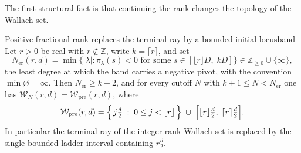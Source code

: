 \documentclass[11pt,letterpaper]{article}
\newcommand{\Zint}{\mathbb{Z}}
\begin{document}
The first structural fact is that continuing the rank changes the topology of the
Wallach set.

\begin{theorem}{Positive fractional rank replaces the terminal ray by a bounded initial locus}{band}
Let $r>0$ be real with $r\notin\Zint$, write $k=\lceil r\rceil$, and set
\begin{equation}
  N_{\mathrm{er}}(r,d)
  =\min\bigl\{|\lambda| : \pi_\lambda(s)<0 \text{ for some }
     s\in[\lfloor r\rfloor D,\;kD]\bigr\}\in\Zint_{\ge0}\cup\{\infty\},
  \label{eq:nero}
\end{equation}
the least degree at which the band carries a negative pivot, with the convention
$\min\varnothing=\infty$. Then $N_{\mathrm{er}}\ge k+2$, and for every cutoff $N$
with $k+1\le N<N_{\mathrm{er}}$ one has
$\mathcal{W}_N(r,d)=\mathcal{W}_{\mathrm{pre}}(r,d)$, where
\begin{equation}
  \mathcal{W}_{\mathrm{pre}}(r,d)
  =\Bigl\{\,j\tfrac{d}{2}\;:\;0\le j<\lfloor r\rfloor\,\Bigr\}
  \;\cup\;\Bigl[\lfloor r\rfloor\tfrac{d}{2},\;\lceil r\rceil\tfrac{d}{2}\Bigr].
  \label{eq:bandlaw}
\end{equation}
In particular the terminal ray of the integer-rank Wallach set is replaced by the
single bounded ladder interval containing $r\tfrac{d}{2}$.
\end{theorem}
\end{document}
